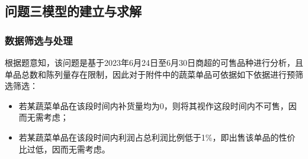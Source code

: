 \documentclass{my_paper}
\begin{document}
\subsection{问题三模型的建立与求解}
\subsubsection{数据筛选与处理}
根据题意知，该问题是基于2023年6月24日至6月30日商超的可售品种进行分析，且单品总数和陈列量存在限制，因此对于附件中的蔬菜单品可依据如下依据进行预筛选筛选：
\begin{itemize}
    \item 若某蔬菜单品在该段时间内补货量均为0，则将其视作这段时间内不可售，因而无需考虑；
    \item 若某蔬菜单品在该段时间内利润占总利润比例低于1\%，即出售该单品的性价比过低，因而无需考虑。
\end{itemize}
\end{document}
